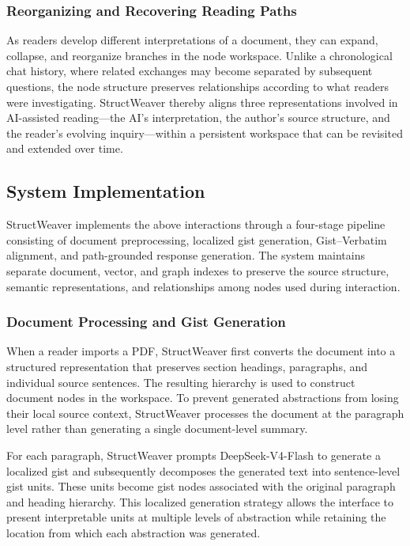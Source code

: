 \documentclass[manuscript,review,anonymous]{acmart}
\begin{document}
\subsubsection{Reorganizing and Recovering Reading Paths}
As readers develop different interpretations of a document, they can expand, collapse, and reorganize branches in the node workspace. Unlike a chronological chat history, where related exchanges may become separated by subsequent questions, the node structure preserves relationships according to what readers were investigating. StructWeaver thereby aligns three representations involved in AI-assisted reading---the AI's interpretation, the author's source structure, and the reader's evolving inquiry---within a persistent workspace that can be revisited and extended over time.

\subsection{System Implementation}
\label{sec:implementation}

StructWeaver implements the above interactions through a four-stage pipeline consisting of document preprocessing, localized gist generation, Gist--Verbatim alignment, and path-grounded response generation. The system maintains separate document, vector, and graph indexes to preserve the source structure, semantic representations, and relationships among nodes used during interaction.

\subsubsection{Document Processing and Gist Generation}
When a reader imports a PDF, StructWeaver first converts the document into a structured representation that preserves section headings, paragraphs, and individual source sentences. The resulting hierarchy is used to construct document nodes in the workspace. To prevent generated abstractions from losing their local source context, StructWeaver processes the document at the paragraph level rather than generating a single document-level summary.

For each paragraph, StructWeaver prompts DeepSeek-V4-Flash to generate a localized gist and subsequently decomposes the generated text into sentence-level gist units. These units become gist nodes associated with the original paragraph and heading hierarchy. This localized generation strategy allows the interface to present interpretable units at multiple levels of abstraction while retaining the location from which each abstraction was generated.
\end{document}
